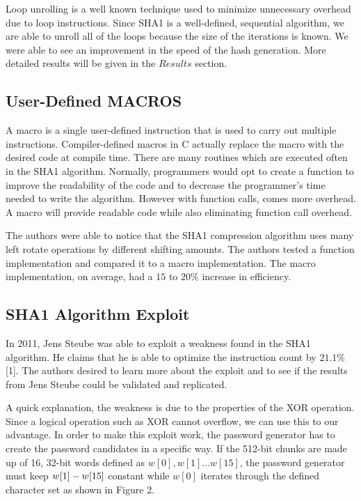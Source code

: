 \documentclass[letterpaper, 10 pt, conference]{ieeeconf}  %
\begin{document}
Loop unrolling is a well known technique used to minimize unnecessary overhead due to loop instructions.  Since SHA1 is a well-defined, sequential algorithm, we are able to unroll all of the loops because the size of the iterations is known.  We were able to see an improvement in the speed of the hash generation.  More detailed results will be given in the $Results$ section.   

\subsection{User-Defined MACROS}

A macro is a single user-defined instruction that is used to carry out multiple instructions.  Compiler-defined macros in C actually replace the macro with the desired code at compile time.  There are many routines which are executed often in the SHA1 algorithm.  Normally, programmers would opt to create a function to improve the readability of the code and to decrease the programmer's time needed to write the algorithm.  However with function calls, comes more overhead.  A macro will provide readable code while also eliminating function call overhead.

The authors were able to notice that the SHA1 compression algorithm uses many left rotate operations by different shifting amounts.  The authors tested a function implementation and compared it to a macro implementation.  The macro implementation, on average, had a $15$ to $20\%$ increase in efficiency.     

\subsection{SHA1 Algorithm Exploit}

In 2011, Jens Steube was able to exploit a weakness found in the SHA1 algorithm. He claims that he is able to optimize the instruction count by $21.1\%$ [1].  The authors desired to learn more about the exploit and to see if the results from Jens Steube could be validated and replicated.

A quick explanation, the weakness is due to the properties of the XOR operation.  Since a logical operation such as XOR cannot overflow, we can use this to our advantage.  In order to make this exploit work, the password generator has to create the password candidates in a specific way.  If the 512-bit chunks are made up of 16, 32-bit words defined as $w[0],w[1]...w[15]$, the password generator must keep $w[1] \-- w[15]$ constant while $w[0]$ iterates through the defined character set as shown in Figure 2.
\end{document}
